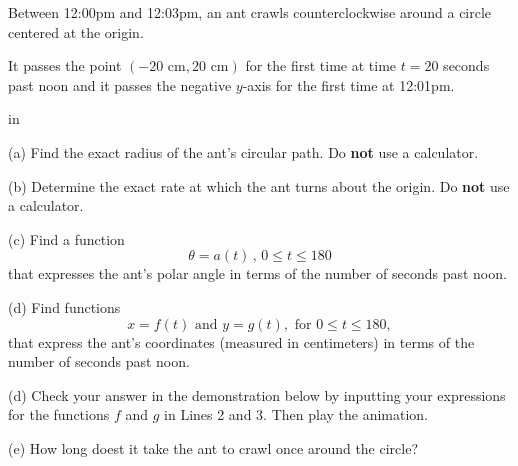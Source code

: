 \documentclass{ximera}
\newcommand{\pskip}{\vskip 0.1 in}
\begin{document}
\begin{question}  \label{Q3dbgdfds5:Motion1}
Between 12:00pm and 12:03pm, an ant crawls counterclockwise around a circle centered at the origin. 

It passes the point $(-20 \text{ cm},20 \text{ cm})$ for the first time at time $t=20$ seconds past noon and it passes the negative $y$-axis for the first time at 12:01pm.

\pskip

(a) Find the exact radius of the ant's circular path. Do {\bf not} use a calculator.

(b) Determine the exact rate at which the ant turns about the origin.  Do {\bf not} use a calculator.

(c) Find a function 
\[
   \theta = a(t) \, , \, 0\leq t \leq 180
\]
that expresses the ant's polar angle in terms of the number of seconds past noon.

(d) Find functions
\[
   x = f(t) \text{ and } y=g(t) , \text{ for } 0\leq t \leq 180 ,
\]
that express the ant's coordinates (measured in centimeters) in terms of the number of seconds past noon. 

(d) Check your answer in the demonstration below by inputting your expressions for the functions $f$ and $g$ in Lines 2 and 3. Then play the animation.

(e) How long doest it take the ant to crawl once around the circle?

 
\begin{onlineOnly}
    \begin{center}
\end{center}
\end{onlineOnly}


\end{question}
\end{document}

